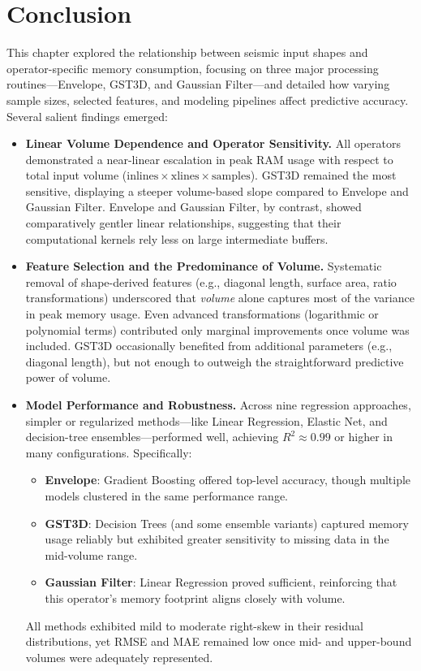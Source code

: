 \section{Conclusion}
\label{sec:pmc-conclusion}

This chapter explored the relationship between seismic input shapes and operator-specific memory consumption, focusing on three major processing routines—Envelope, \ac{GST3D}, and Gaussian Filter—and detailed how varying sample sizes, selected features, and modeling pipelines affect predictive accuracy.
Several salient findings emerged:

\begin{itemize}
    \item \textbf{Linear Volume Dependence and Operator Sensitivity.}
    All operators demonstrated a near-linear escalation in peak \ac{RAM} usage with respect to total input volume (\( \text{inlines} \times \text{xlines} \times \text{samples} \)).
    \ac{GST3D} remained the most sensitive, displaying a steeper volume-based slope compared to Envelope and Gaussian Filter.
    Envelope and Gaussian Filter, by contrast, showed comparatively gentler linear relationships, suggesting that their computational kernels rely less on large intermediate buffers.

    \item \textbf{Feature Selection and the Predominance of Volume.}
    Systematic removal of shape-derived features (e.g., diagonal length, surface area, ratio transformations) underscored that \emph{volume} alone captures most of the variance in peak memory usage.
    Even advanced transformations (logarithmic or polynomial terms) contributed only marginal improvements once volume was included.
    \ac{GST3D} occasionally benefited from additional parameters (e.g., diagonal length), but not enough to outweigh the straightforward predictive power of volume.

    \item \textbf{Model Performance and Robustness.}
    Across nine regression approaches, simpler or regularized methods—like \ac{Linear Regression}, Elastic Net, and decision-tree ensembles—performed well, achieving \(R^2 \approx 0.99\) or higher in many configurations.
    Specifically:
    \begin{itemize}
        \item \textbf{Envelope}: Gradient Boosting offered top-level accuracy, though multiple models clustered in the same performance range.
        \item \textbf{\ac{GST3D}}: Decision Trees (and some ensemble variants) captured memory usage reliably but exhibited greater sensitivity to missing data in the mid-volume range.
        \item \textbf{Gaussian Filter}: \ac{Linear Regression} proved sufficient, reinforcing that this operator’s memory footprint aligns closely with volume.
    \end{itemize}
    All methods exhibited mild to moderate right-skew in their residual distributions, yet \ac{RMSE} and \ac{MAE} remained low once mid- and upper-bound volumes were adequately represented.


\end{itemize}
